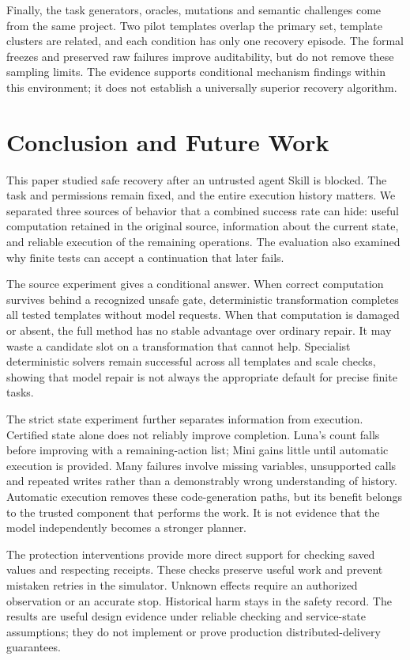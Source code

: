 \documentclass[conference]{IEEEtran}
\begin{document}
Finally, the task generators, oracles, mutations and semantic challenges come from the same project. Two pilot templates overlap the primary set, template clusters are related, and each condition has only one recovery episode. The formal freezes and preserved raw failures improve auditability, but do not remove these sampling limits. The evidence supports conditional mechanism findings within this environment; it does not establish a universally superior recovery algorithm.

\section{Conclusion and Future Work}
This paper studied safe recovery after an untrusted agent Skill is blocked. The task and permissions remain fixed, and the entire execution history matters. We separated three sources of behavior that a combined success rate can hide: useful computation retained in the original source, information about the current state, and reliable execution of the remaining operations. The evaluation also examined why finite tests can accept a continuation that later fails.

The source experiment gives a conditional answer. When correct computation survives behind a recognized unsafe gate, deterministic transformation completes all tested templates without model requests. When that computation is damaged or absent, the full method has no stable advantage over ordinary repair. It may waste a candidate slot on a transformation that cannot help. Specialist deterministic solvers remain successful across all templates and scale checks, showing that model repair is not always the appropriate default for precise finite tasks.

The strict state experiment further separates information from execution. Certified state alone does not reliably improve completion. Luna's count falls before improving with a remaining-action list; Mini gains little until automatic execution is provided. Many failures involve missing variables, unsupported calls and repeated writes rather than a demonstrably wrong understanding of history. Automatic execution removes these code-generation paths, but its benefit belongs to the trusted component that performs the work. It is not evidence that the model independently becomes a stronger planner.

The protection interventions provide more direct support for checking saved values and respecting receipts. These checks preserve useful work and prevent mistaken retries in the simulator. Unknown effects require an authorized observation or an accurate stop. Historical harm stays in the safety record. The results are useful design evidence under reliable checking and service-state assumptions; they do not implement or prove production distributed-delivery guarantees.
\end{document}
